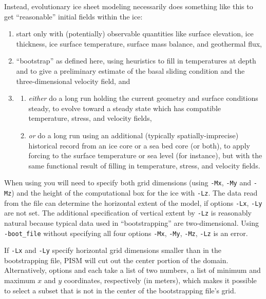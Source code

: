 Instead, evolutionary ice sheet modeling necessarily does something like this
to get ``reasonable'' initial fields within the ice:
\begin{enumerate}
\item start only with (potentially) observable quantities like surface elevation, ice thickness, ice surface temperature, surface mass balance, and geothermal flux,
\item ``bootstrap'' as defined here, using heuristics to fill in temperatures at depth and to give a preliminary estimate of the basal sliding condition and the three-dimensional velocity field, and
\item \begin{enumerate}
      \item \emph{either} do a long run holding the current geometry and surface conditions steady, to evolve toward a steady state which has compatible temperature, stress, and velocity fields,
      \item \emph{or} do a long run using an additional (typically spatially-imprecise) historical record from an ice core or a sea bed core (or both), to apply forcing to the surface temperature or sea level (for instance), but with the same functional result of filling in temperature, stress, and velocity fields.
      \end{enumerate}
\end{enumerate}

When using  you will need to specify both grid dimensions (using \texttt{-Mx}, \texttt{-My} and \texttt{-Mz}) and the height of the computational box for the ice with \texttt{-Lz}.  The data read from the file can determine the horizontal extent of the model, if options \texttt{-Lx}, \texttt{-Ly} are not set.  The additional specification of vertical extent by \texttt{-Lz} is reasonably natural because typical data used in ``bootstrapping'' are two-dimensional.  Using \texttt{-boot_file} without specifying all four options \texttt{-Mx}, \texttt{-My}, \texttt{-Mz}, \texttt{-Lz} is an error.

If \texttt{-Lx} and \texttt{-Ly} specify horizontal grid dimensions smaller than in the bootstrapping file, PISM will cut out the center portion of the domain.  Alternatively, options  and  each take a list of two numbers, a list of minimum and maximum $x$ and $y$ coordinates, respectively (in meters), which makes it possible to select a subset that is not in the center of the bootstrapping file's grid.

